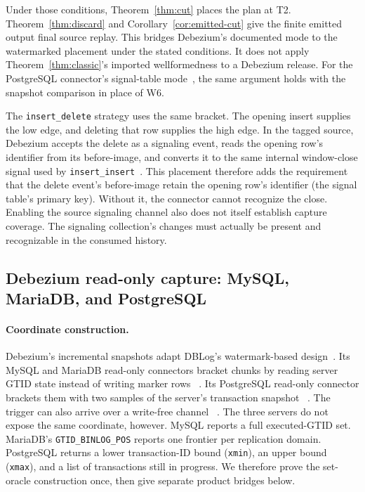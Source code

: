 \documentclass[sigconf,nonacm,10pt]{acmart}
\theoremstyle{plain}
\theoremstyle{definition}
\begin{document}
Under those conditions, Theorem~\ref{thm:cut} places the plan at T2.
Theorem~\ref{thm:discard} and Corollary~\ref{cor:emitted-cut} give the
finite emitted output final source replay. This bridges Debezium's documented mode to the watermarked placement
under the stated conditions. It does not apply Theorem~\ref{thm:classic}'s
imported wellformedness to a Debezium release. For the PostgreSQL
connector's signal-table mode~\cite{debezium_postgresql_connector}, the
same argument holds with the snapshot comparison in place of W6.

The \texttt{insert\_delete} strategy uses the same bracket. The opening
insert supplies the low edge, and deleting that row supplies the high edge.
In the tagged source, Debezium accepts the delete as a signaling event,
reads the opening row's identifier from its before-image, and converts
it to the same internal window-close signal used by
\texttt{insert\_insert}~\cite{debezium_signal_delete_source}. This
placement therefore adds the requirement that the delete event's
before-image retain the opening row's identifier (the signal table's
primary key). Without it, the connector cannot recognize the close.
Enabling the source signaling channel also does not itself establish capture coverage. The
signaling collection's changes must actually be present and recognizable
in the consumed history.

\subsection{Debezium read-only capture: MySQL, MariaDB, and PostgreSQL}
\label{sec:inst-readonly}

\paragraph{Coordinate construction.}

Debezium's incremental snapshots adapt DBLog's watermark-based
design~\cite{debezium_incremental_snapshots,debezium_ddd3}. Its MySQL and MariaDB
read-only connectors bracket chunks by reading
server GTID state instead of writing marker rows
~\cite{debezium_mysql_connector,debezium_mariadb_connector,debezium_readonly_blog}.
Its PostgreSQL read-only connector brackets them with two samples of
the server's transaction snapshot
~\cite{debezium_ddd8,debezium_postgresql_connector}. The
trigger can also arrive over a write-free channel
~\cite{debezium_signalling}. The three servers do not expose the same
coordinate, however. MySQL reports a full executed-GTID set. MariaDB's
\texttt{GTID\_\allowbreak{}BINLOG\_\allowbreak{}POS} reports one frontier per replication domain.
PostgreSQL returns a lower transaction-ID bound (\texttt{xmin}), an upper
bound (\texttt{xmax}), and a list of transactions still in progress.
We therefore prove the set-oracle construction once, then give
separate product bridges below.
\end{document}
